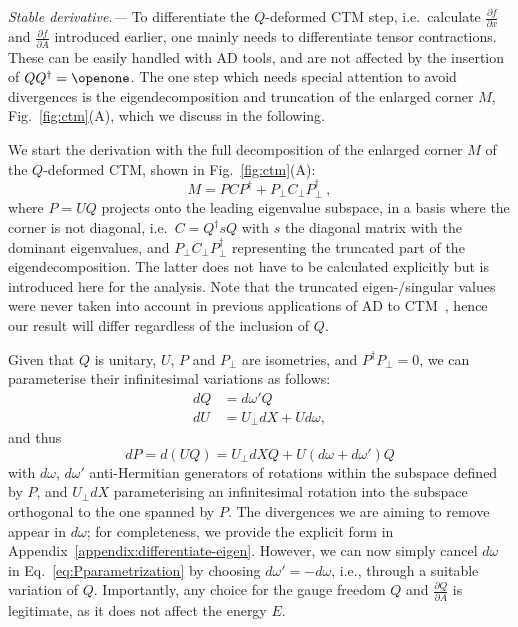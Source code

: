\documentclass[twocolumn,floatfix,superscriptaddress,longbibliography,pra]{revtex4-2}
\renewcommand{\section}[1]{\emph{#1.---}}
\begin{document}
\section{Stable derivative}%
To differentiate the $Q$-deformed CTM step, i.e.\ calculate $\frac{\partial f}{\partial x}$ and $\frac{\partial f}{\partial A}$ introduced earlier, one mainly needs to differentiate tensor contractions. These can be easily handled with AD tools, and are not affected by the insertion of $QQ^\dagger=\openone$. 
The one step which needs special attention to avoid divergences is the eigendecomposition and truncation of the enlarged corner $M$, Fig.~\ref{fig:ctm}(A), which we discuss in the following.


We start the derivation with the full decomposition of the enlarged corner $M$ of the $Q$-deformed CTM, shown in Fig.~\ref{fig:ctm}(A):
\begin{equation}
    M=P C P^\dagger + P_\perp C_\perp P_\perp^\dagger\ ,
    \label{eq:Mdecomp}
\end{equation}
where $P = UQ$ projects onto the leading eigenvalue subspace, in a basis where the corner is not diagonal, i.e.\ $C=Q^\dagger s Q$ with $s$ the diagonal matrix with the dominant eigenvalues, 
and $P_\perp C_\perp P_\perp^\dagger$ representing the truncated part of the eigendecomposition. The latter does not have to be calculated explicitly but is introduced here for the analysis. Note that the truncated eigen-/singular values were never taken into account in previous applications of AD to CTM~\cite{AD_CTM,Juraj_1AD,variPEPS}, hence our result will differ regardless of the inclusion of $Q$.


Given that $Q$ is unitary, $U$, $P$ and $P_\perp$ are isometries, and $P^\dagger P_\perp=0$, we can parameterise their infinitesimal variations as follows:
\begin{align}
dQ&=d\omega' Q \\
dU&=U_\perp dX + U d\omega,
\label{eq:Uparametrization}
\end{align}
and thus
\begin{equation}
dP=d(UQ) = U_\perp dX Q + U(d\omega +d\omega')Q 
     \label{eq:Pparametrization}
\end{equation}
with $d\omega$, $d\omega'$ anti-Hermitian generators of rotations within the subspace defined by $P$, and $U_\perp dX$ parameterising an infinitesimal rotation into the subspace orthogonal to the one spanned by $P$. The divergences we are aiming to remove appear in $d\omega$; for completeness, we provide the explicit form in Appendix~\ref{appendix:differentiate-eigen}. 
However, we can now simply cancel $d\omega$ in 
Eq.~\eqref{eq:Pparametrization} by choosing $d\omega'=-d\omega$, i.e., through a suitable variation of $Q$. Importantly, 
any choice for the gauge freedom $Q$ and $\frac{\partial Q}{\partial A}$ is legitimate, as it does not affect the energy $E$.  
\end{document}
